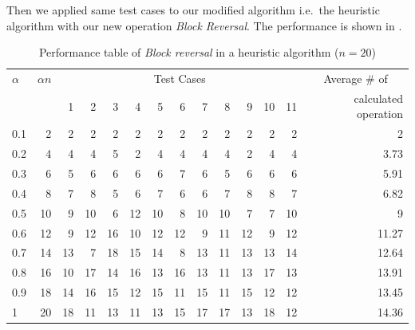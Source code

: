 				
Then we applied same test cases to our modified algorithm i.e.\ the
heuristic algorithm with our new operation \textit{Block Reversal}. The
performance is shown in .


\begin{table}[!tb]
  \begin{center}
    \caption{Performance table of \emph{Block reversal} in a heuristic algorithm ($n=20$)}
    \label{tab_our}

    \begin{tabular}{|l|r|r|r|r|r|r|r|r|r|r|r|r|r|}
      \hline
      $\alpha$     & $\alpha n$ & \multicolumn{11}{c|}{Test Cases} & \multicolumn{1}{c|}{Average \# of}                                     \\
      \cline{3-13} &            & 1                                & 2  & 3  & 4  & 5  & 6  & 7  & 8  & 9  & 10 & 11 & calculated operation \\
      \hline
      0.1        & 2          & 2                                & 2	& 2  & 2  & 2  & 2  & 2  & 2  &	2  & 2	& 2  & 2                    \\
      0.2        & 4          & 4                                & 4	& 5  & 2  & 4  & 4  & 4  & 4  &	2  & 4	& 4  & 3.73                 \\
      0.3        & 6          & 5                                & 6	& 6  & 6  & 6  & 7  & 6  & 5  &	6  & 6	& 6  & 5.91                 \\
      0.4        & 8          & 7                                & 8	& 5  & 6  & 7  & 6  & 6  & 7  &	8  & 8	& 7  & 6.82                 \\
      0.5        & 10         & 9                                & 10	& 6  & 12 & 10 & 8  & 10 & 10 &	7  & 7	& 10 & 9                    \\
      0.6        & 12         & 9                                & 12	& 16 & 10 & 12 & 12 & 9  & 11 &	12 & 9	& 12 & 11.27                \\
      0.7        & 14         & 13                               & 7	& 18 & 15 & 14 & 8  & 13 & 11 &	13 & 13	& 14 & 12.64                \\
      0.8        & 16         & 10                               & 17	& 14 & 16 & 13 & 16 & 13 & 11 &	13 & 17	& 13 & 13.91                \\
      0.9        & 18         & 14                               & 16	& 15 & 12 & 15 & 11 & 15 & 11 &	15 & 12	& 12 & 13.45                \\
      1          & 20         & 18                               & 11	& 13 & 11 & 13 & 15 & 17 & 17 &	13 & 18	& 12 & 14.36                \\
      \hline
    \end{tabular}
  \end{center}
\end{table}


